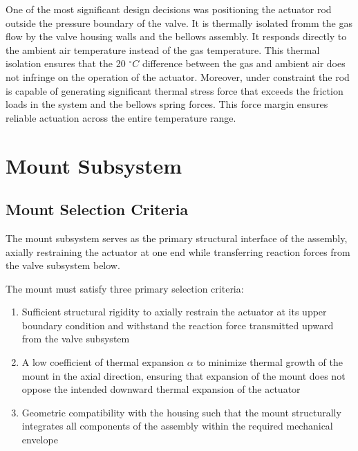 \documentclass[12pt, letterpaper]{report}%
\newcounter{mycounter}           %
\newcounter{sub}[mycounter]      %
\newcommand{\degC}{^{\circ}C}    %
\begin{document}
            One of the most significant design decisions was positioning the actuator rod outside the pressure boundary of the valve. It is thermally isolated fromm the gas flow by the valve housing walls and the bellows assembly. It responds directly to the ambient air temperature instead of the gas temperature.
            This thermal isolation ensures that the 20 $\degC$ difference between the gas and ambient air does not infringe on the operation of the actuator. Moreover, under constraint the rod is capable of generating significant thermal stress force that exceeds the friction loads in the system and the bellows spring forces. 
            This force margin ensures reliable actuation across the entire temperature range. 

    \section{Mount Subsystem}
    \label{sec:mount_sub_description}

        \subsection{Mount Selection Criteria}
        \label{subsec:mount_sel_crit}
            The mount subsystem serves as the primary structural interface of the assembly, 
axially restraining the actuator at one end while transferring reaction forces 
from the valve subsystem below. 

The mount must satisfy three primary selection criteria:

\begin{enumerate}
    \item Sufficient structural rigidity to axially restrain the actuator at its 
    upper boundary condition and withstand the reaction force transmitted upward 
    from the valve subsystem

    \item A low coefficient of thermal expansion $\alpha$ to minimize thermal 
    growth of the mount in the axial direction, ensuring that expansion of the 
    mount does not oppose the intended downward thermal expansion of the actuator

    \item Geometric compatibility with the housing such that the mount 
    structurally integrates all components of the assembly within the required mechanical envelope

\end{enumerate}
\end{document}
